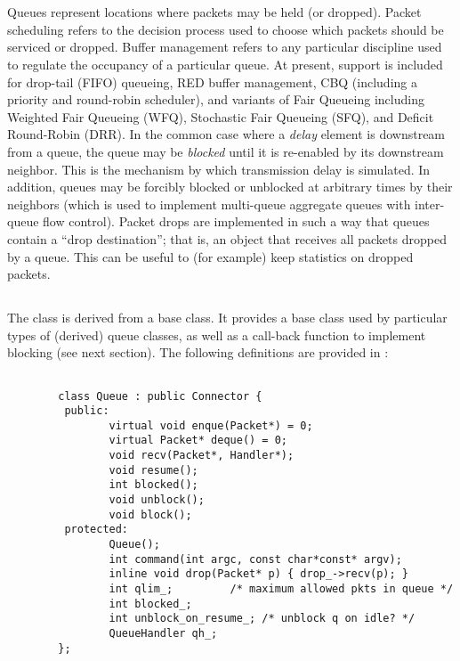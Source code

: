 %
%
\section{}

Queues represent locations where packets may be held (or dropped).
Packet scheduling refers to the decision process used to choose
which packets should be serviced or dropped.
Buffer management refers to any particular discipline used
to regulate the occupancy of a particular queue.
At present, support is included for drop-tail (FIFO) queueing,
RED buffer management, CBQ (including a priority and round-robin scheduler), and
variants of Fair Queueing including Weighted Fair Queueing (WFQ), 
Stochastic Fair Queueing (SFQ), and Deficit Round-Robin (DRR).
In the common case where a {\em delay} element is downstream from
a queue, the queue may be {\em blocked} until it is re-enabled
by its downstream neighbor.
This is the mechanism by which transmission delay is simulated.
In addition, queues may be forcibly blocked or unblocked at arbitrary
times by their neighbors (which is used to implement multi-queue
aggregate queues with inter-queue flow control).
Packet drops are implemented in such a way that queues contain
a ``drop destination''; that is, an object that receives all packets
dropped by a queue.
This can be useful to (for example) keep statistics on dropped packets.

\subsection{}

The  class is derived from a  base class.
It provides a base class used by particular types of (derived) queue classes,
as well as a call-back function to implement blocking (see next section).
The following definitions are provided in :
\begin{small}
\begin{verbatim}

        class Queue : public Connector {
         public:
                virtual void enque(Packet*) = 0;
                virtual Packet* deque() = 0;
                void recv(Packet*, Handler*);
                void resume();
                int blocked();
                void unblock();
                void block();
         protected:
                Queue();
                int command(int argc, const char*const* argv);
                inline void drop(Packet* p) { drop_->recv(p); }
                int qlim_;         /* maximum allowed pkts in queue */
                int blocked_;
                int unblock_on_resume_; /* unblock q on idle? */
                QueueHandler qh_;
        };
\end{verbatim}
\end{small}

